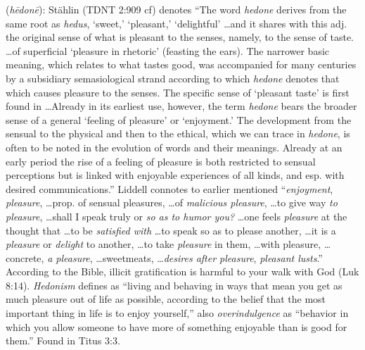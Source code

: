 \item[Overindulgence,]

(\textit{hēdonē}):
Stählin (TDNT 2:909 cf) denotes ``The word \emph{hedone} derives from the same root as \emph{hedus}, `sweet,' `pleasant,' `delightful' \ldots and it shares with this adj. the original sense of what is pleasant to the senses, namely, to the sense of taste. \ldots of superficial `pleasure in rhetoric' (feasting the ears). The narrower basic meaning, which relates to what tastes good, was accompanied for many centuries by a subsidiary semasiological strand according to which \emph{hedone} denotes that which causes pleasure to the senses. The specific sense of `pleasant taste' is first found in \ldots Already in its earliest use, however, the term \emph{hedone} bears the broader sense of a general `feeling of pleasure' or `enjoyment.' The development from the sensual to the physical and then to the ethical, which we can trace in \emph{hedone}, is often to be noted in the evolution of words and their meanings. Already at an early period the rise of a feeling of pleasure is both restricted to sensual perceptions but is linked with enjoyable experiences of all kinds, and esp. with desired communications.'' Liddell connotes to earlier mentioned ``\emph{enjoyment}, \emph{pleasure}, \ldots prop. of sensual pleasures, \ldots of \emph{malicious pleasure}, \ldots to give way \emph{to pleasure}, \ldots shall I speak truly or \emph{so as to humor you?} \ldots one feels \emph{pleasure} at the thought that \ldots to be \emph{satisfied with} \ldots to speak so as to please another, \ldots it is a \emph{pleasure} or \emph{delight} to another, \ldots to take \emph{pleasure} in them, \ldots with pleasure, \ldots concrete, \emph{a pleasure}, \ldots sweetmeats, \ldots \emph{desires after pleasure}, \emph{pleasant lusts}.'' According to the Bible, illicit gratification is harmful to your walk with God (Luk 8:14). \emph{Hedonism} defines as ``living and behaving in ways that mean you get as much pleasure out of life as possible, according to the belief that the most important thing in life is to enjoy yourself,'' also \emph{overindulgence} as ``behavior in which you allow someone to have more of something enjoyable than is good for them.''
Found in Titus 3:3.
